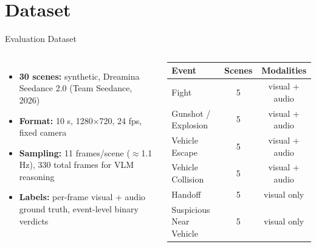 \documentclass[aspectratio=169,10pt]{beamer}
\begin{document}
\section{Dataset}
\begin{frame}{Evaluation Dataset}
\footnotesize
\begin{columns}[T,onlytextwidth]
\begin{itemize}
  \item \textbf{30 scenes:} synthetic, Dreamina Seedance 2.0 (Team Seedance, 2026)
  \item \textbf{Format:} 10 s, 1280$\times$720, 24 fps, fixed camera
  \item \textbf{Sampling:} 11 frames/scene ($\approx$1.1 Hz), 330 total frames for VLM reasoning
  \item \textbf{Labels:} per-frame visual + audio ground truth, event-level binary verdicts
\end{itemize}
\raggedright\leavevmode\hspace*{-0.12cm}\begin{tabular}{lcc}
\toprule
Event & Scenes & Modalities \\
\midrule
Fight & 5 & visual + audio \\
Gunshot / Explosion & 5 & visual + audio \\
Vehicle Escape & 5 & visual + audio \\
Vehicle Collision & 5 & visual + audio \\
Handoff & 5 & visual only \\
Suspicious Near Vehicle & 5 & visual only \\
\bottomrule
\end{tabular}
\end{columns}
\end{frame}

\end{document}
